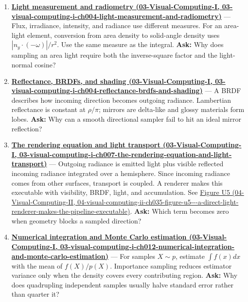 \begin{enumerate}
\item
  \textbf{\href{../03-Visual-Computing-I/main.pdf\#nameddest=03-visual-computing-i-ch004-light-measurement-and-radiometry}{Light measurement and radiometry (03-Visual-Computing-I, 03-visual-computing-i-ch004-light-measurement-and-radiometry)}} --- Flux, irradiance, intensity, and radiance use different measures. For an area-light element, conversion from area density to solid-angle density uses \(|n_y\cdot(-\omega)|/r^2\). Use the same measure as the integral. \textbf{Ask:} Why does sampling an area light require both the inverse-square factor and the light-normal cosine?
\item
  \textbf{\href{../03-Visual-Computing-I/main.pdf\#nameddest=03-visual-computing-i-ch004-reflectance-brdfs-and-shading}{Reflectance, BRDFs, and shading (03-Visual-Computing-I, 03-visual-computing-i-ch004-reflectance-brdfs-and-shading)}} --- A BRDF describes how incoming direction becomes outgoing radiance. Lambertian reflectance is constant at \(\rho/\pi\); mirrors are delta-like and glossy materials form lobes. \textbf{Ask:} Why can a smooth directional sampler fail to hit an ideal mirror reflection?
\item
  \textbf{\href{../03-Visual-Computing-I/main.pdf\#nameddest=03-visual-computing-i-ch007-the-rendering-equation-and-light-transport}{The rendering equation and light transport (03-Visual-Computing-I, 03-visual-computing-i-ch007-the-rendering-equation-and-light-transport)}} --- Outgoing radiance is emitted light plus visible reflected incoming radiance integrated over a hemisphere. Since incoming radiance comes from other surfaces, transport is coupled. A renderer makes this executable with visibility, BRDF, light, and accumulation. See \href{../04-Visual-Computing-II/main.pdf\#nameddest=04-visual-computing-ii-ch035-figure-u5---a-direct-light-renderer-makes-the-pipeline-executable}{Figure U5 (04-Visual-Computing-II, 04-visual-computing-ii-ch035-figure-u5-\/-\/-a-direct-light-renderer-makes-the-pipeline-executable)}. \textbf{Ask:} Which term becomes zero when geometry blocks a sampled direction?
\item
  \textbf{\href{../03-Visual-Computing-I/main.pdf\#nameddest=03-visual-computing-i-ch012-numerical-integration-and-monte-carlo-estimation}{Numerical integration and Monte Carlo estimation (03-Visual-Computing-I, 03-visual-computing-i-ch012-numerical-integration-and-monte-carlo-estimation)}} --- For samples \(X\sim p\), estimate \(\int f(x)dx\) with the mean of \(f(X)/p(X)\). Importance sampling reduces estimator variance only when the density covers every contributing region. \textbf{Ask:} Why does quadrupling independent samples usually halve standard error rather than quarter it?

\end{enumerate}
